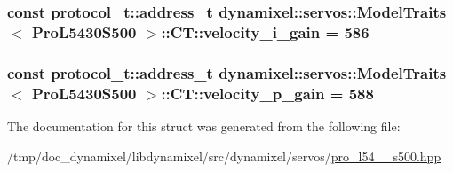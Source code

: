 \subsubsection[{velocity\+\_\+i\+\_\+gain}]{\setlength{\rightskip}{0pt plus 5cm}const {\bf protocol\+\_\+t\+::address\+\_\+t} {\bf dynamixel\+::servos\+::\+Model\+Traits}$<$ {\bf Pro\+L5430\+S500} $>$\+::C\+T\+::velocity\+\_\+i\+\_\+gain = 586\hspace{0.3cm}{\ttfamily [static]}}\label{structdynamixel_1_1servos_1_1_model_traits_3_01_pro_l5430_s500_01_4_1_1_c_t_ad10e1217ce2e776ec790444f4f2a147f}
\hypertarget{structdynamixel_1_1servos_1_1_model_traits_3_01_pro_l5430_s500_01_4_1_1_c_t_ad39c3621b051576709612be62a26f9a1}{}
\subsubsection[{velocity\+\_\+p\+\_\+gain}]{\setlength{\rightskip}{0pt plus 5cm}const {\bf protocol\+\_\+t\+::address\+\_\+t} {\bf dynamixel\+::servos\+::\+Model\+Traits}$<$ {\bf Pro\+L5430\+S500} $>$\+::C\+T\+::velocity\+\_\+p\+\_\+gain = 588\hspace{0.3cm}{\ttfamily [static]}}\label{structdynamixel_1_1servos_1_1_model_traits_3_01_pro_l5430_s500_01_4_1_1_c_t_ad39c3621b051576709612be62a26f9a1}


The documentation for this struct was generated from the following file\+:\begin{DoxyCompactItemize}
\item 
/tmp/doc\+\_\+dynamixel/libdynamixel/src/dynamixel/servos/\hyperlink{pro__l54__30__s500_8hpp}{pro\+\_\+l54\+\_\+\_\+s500.\+hpp}\end{DoxyCompactItemize}
